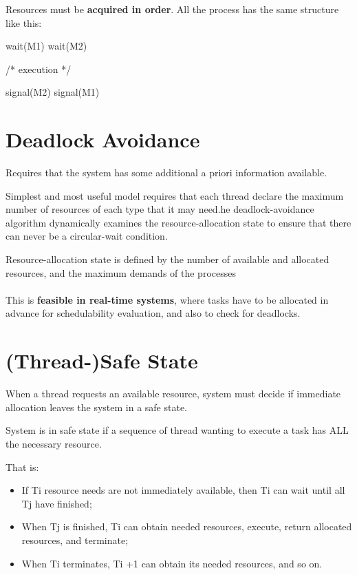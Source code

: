 Resources must be \textbf{acquired in order}.
All the process has the same structure like this:

\begin{codeInC}
wait(M1)
wait(M2)

/* execution */

signal(M2)
signal(M1)    
\end{codeInC}
\newpage

\section{Deadlock Avoidance}

Requires that the system has some additional a priori information available.

Simplest and most useful model requires that each thread declare the maximum number of resources of each type that it may need.he deadlock-avoidance algorithm dynamically examines the
resource-allocation state to ensure that there can never be a
circular-wait condition.

Resource-allocation state is defined by the number of available and
allocated resources, and the maximum demands of the processes

\paragraph{}
This is \textbf{feasible in real-time systems}, where tasks have to be
allocated in advance for schedulability evaluation, and also to check for deadlocks.


\section{(Thread-)Safe State}
When a thread requests an available resource, system must decide if immediate allocation leaves the system in a safe state.

System is in safe state if a sequence of thread wanting to execute a task has ALL the necessary resource.

That is:
\begin{itemize}
    \item If Ti resource needs are not immediately available, then Ti can wait until all Tj have finished;
    \item When Tj is finished, Ti can obtain needed resources, execute, return allocated resources, and terminate;
    \item When Ti terminates, Ti +1 can obtain its needed resources, and so on.
\end{itemize}

